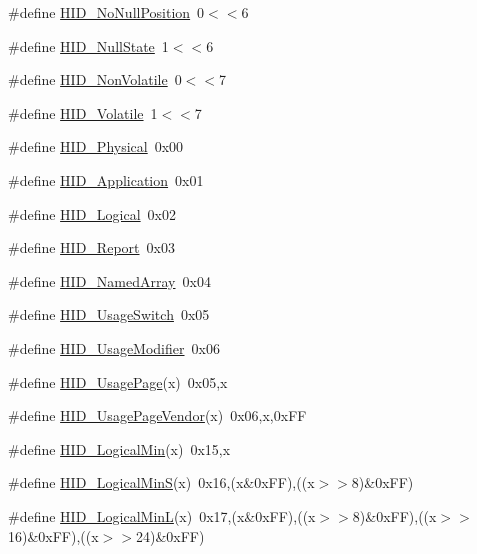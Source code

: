 \begin{DoxyCompactItemize}
\item 
\#define \hyperlink{group__USBD__HID_ga50afbd72aee1f01fb66dd8f66072d868}{H\-I\-D\-\_\-\-No\-Null\-Position}~0$<$$<$6
\item 
\#define \hyperlink{group__USBD__HID_gadec99260a6ecefe2e46e39012b2e7975}{H\-I\-D\-\_\-\-Null\-State}~1$<$$<$6
\item 
\#define \hyperlink{group__USBD__HID_ga52a56594ad1585cb02b546ec37a9f583}{H\-I\-D\-\_\-\-Non\-Volatile}~0$<$$<$7
\item 
\#define \hyperlink{group__USBD__HID_ga6ed11f818503dd47f763dbd2fc169710}{H\-I\-D\-\_\-\-Volatile}~1$<$$<$7
\item 
\#define \hyperlink{group__USBD__HID_ga306baa2119b8f91dbd0cf307615458a2}{H\-I\-D\-\_\-\-Physical}~0x00
\item 
\#define \hyperlink{group__USBD__HID_ga0414b1645cd3021032e786006d7161df}{H\-I\-D\-\_\-\-Application}~0x01
\item 
\#define \hyperlink{group__USBD__HID_gaae23502c22d0731b8c1c6229073638b1}{H\-I\-D\-\_\-\-Logical}~0x02
\item 
\#define \hyperlink{group__USBD__HID_ga00277f2ebb6c21634b4efb4ac484cc08}{H\-I\-D\-\_\-\-Report}~0x03
\item 
\#define \hyperlink{group__USBD__HID_ga24770d0159596a60c690b4ac55d5b3de}{H\-I\-D\-\_\-\-Named\-Array}~0x04
\item 
\#define \hyperlink{group__USBD__HID_ga967840ecaa570192e44da1e68457faba}{H\-I\-D\-\_\-\-Usage\-Switch}~0x05
\item 
\#define \hyperlink{group__USBD__HID_ga4ce2a1dddd5fa7318aaec83b1bdebccf}{H\-I\-D\-\_\-\-Usage\-Modifier}~0x06
\item 
\#define \hyperlink{group__USBD__HID_gad7c0e2c28b4a3d728bfa2fab4eb864db}{H\-I\-D\-\_\-\-Usage\-Page}(x)~0x05,x
\item 
\#define \hyperlink{group__USBD__HID_ga34d3f9ba06f31388ecdae07ae1a565b6}{H\-I\-D\-\_\-\-Usage\-Page\-Vendor}(x)~0x06,x,0x\-F\-F
\item 
\#define \hyperlink{group__USBD__HID_ga8d68f7a75a1388bc48415af7f2d2b6d7}{H\-I\-D\-\_\-\-Logical\-Min}(x)~0x15,x
\item 
\#define \hyperlink{group__USBD__HID_ga3df4a06c6538b00ab3a90fd40f4a83ac}{H\-I\-D\-\_\-\-Logical\-Min\-S}(x)~0x16,(x\&0x\-F\-F),((x$>$$>$8)\&0x\-F\-F)
\item 
\#define \hyperlink{group__USBD__HID_gaf44470ee63060671e88f8dcde3baa3af}{H\-I\-D\-\_\-\-Logical\-Min\-L}(x)~0x17,(x\&0x\-F\-F),((x$>$$>$8)\&0x\-F\-F),((x$>$$>$16)\&0x\-F\-F),((x$>$$>$24)\&0x\-F\-F)

\end{DoxyCompactItemize}
